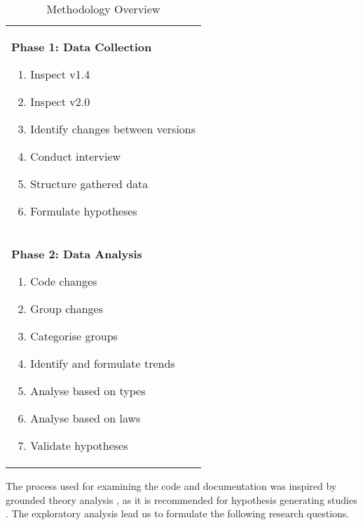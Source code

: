 \documentclass{sig-alternate}
\begin{document}
\begin{table}
       \centering
       \begin{tabular}[ht]{p{3in}}
              \toprule

              \textbf{Phase 1: Data Collection}
              
              \begin{enumerate}
				\item Inspect v1.4
				\item Inspect v2.0
				\item Identify changes between versions
				\item Conduct interview
				\item Structure gathered data
				\item Formulate hypotheses
              \end{enumerate} \\ 


              
              \textbf{Phase 2: Data Analysis} 
              
              \begin{enumerate}
              \item Code changes
              \item Group changes
              \item Categorise groups 
              \item Identify and formulate trends
              \item Analyse based on types \cite{chapin2001types}
              \item Analyse based on laws \cite{lehman90sview}
              \item Validate hypotheses
              \end{enumerate} \\
              
              \bottomrule
       \end{tabular}
       \caption{Methodology Overview}
       \label{table:meth_steps}
\end{table} 

The process used for examining the code and documentation was inspired by grounded theory analysis \cite{seaman1999qualitative}, as it is recommended for hypothesis generating studies \cite{runeson2009guidelines, seaman1999qualitative}. The exploratory analysis lead us to formulate the following research questions.
\end{document}
